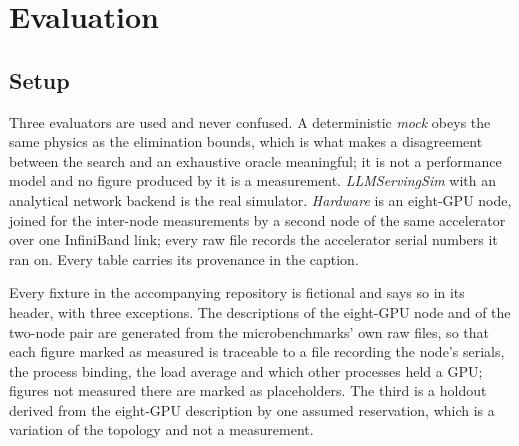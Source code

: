 \section{Evaluation}
\label{sec:eval}

\subsection{Setup}

Three evaluators are used and never confused. A deterministic \emph{mock} obeys
the same physics as the elimination bounds, which is what makes a disagreement
between the search and an exhaustive oracle meaningful; it is not a
performance model and no figure produced by it is a measurement.
\emph{LLMServingSim} with an analytical network backend is the real simulator.
\emph{Hardware} is an eight-GPU node, joined for the inter-node measurements by
a second node of the same accelerator over one InfiniBand link; every raw file
records the accelerator serial numbers it ran on. Every table carries its
provenance in the caption.

Every fixture in the accompanying repository is fictional and says so in its
header, with three exceptions. The descriptions of the eight-GPU node and of
the two-node pair are generated from the microbenchmarks' own raw files, so
that each figure marked as measured is traceable to a file recording the
node's serials, the process binding, the load average and which other
processes held a GPU; figures not measured there are marked as placeholders.
The third is a holdout derived from the eight-GPU description by one assumed
reservation, which is a variation of the topology and not a measurement.

